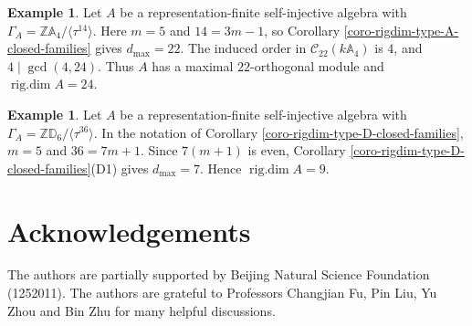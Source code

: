\documentclass[12pt]{article}
\theoremstyle{plain}
\theoremstyle{definition}
\newtheorem{Example}[Def]{Example}
\DeclareMathOperator{\rigdim}{rig.dim}
\begin{document}
\begin{Example}
Let \(A\) be a representation-finite self-injective algebra with
\(\Gamma_A=\mathbb Z\mathbb A_4/\langle\tau^{14}\rangle\).  Here
\(m=5\) and \(14=3m-1\), so Corollary
\ref{coro-rigdim-type-A-closed-families} gives \(d_{\max}=22\).  The induced
order in \(\mathcal C_{22}(k\mathbb A_4)\) is \(4\), and
\(4\mid\gcd(4,24)\).  Thus \(A\) has a maximal \(22\)-orthogonal
module and \(\rigdim A=24\).
\end{Example}

\begin{Example}
Let \(A\) be a representation-finite self-injective algebra with
\(\Gamma_A=\mathbb Z\mathbb D_6/\langle\tau^{36}\rangle\).  In the notation of
Corollary \ref{coro-rigdim-type-D-closed-families}, \(m=5\) and
\(36=7m+1\).  Since \(7(m+1)\) is even, Corollary
\ref{coro-rigdim-type-D-closed-families}(D1) gives \(d_{\max}=7\).  Hence
\(\rigdim A=9\).
\end{Example}


\section*{Acknowledgements}

 The authors are partially supported by
Beijing Natural Science Foundation (1252011). The authors are grateful to Professors Changjian Fu, Pin Liu, Yu Zhou and Bin Zhu
for many helpful discussions. 


    
\end{document}
